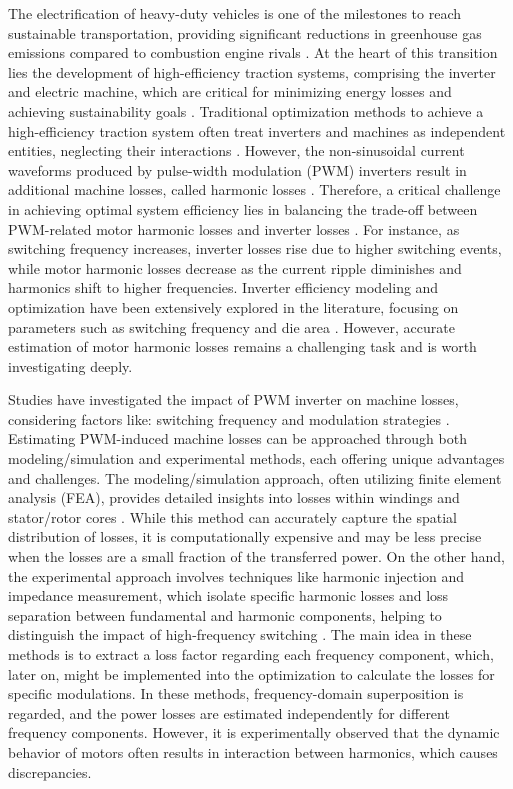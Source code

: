\documentclass[conference]{IPEC2026}
\begin{document}
The electrification of heavy-duty vehicles is one of the milestones to reach sustainable transportation, providing significant reductions in greenhouse gas emissions compared to combustion engine rivals \cite{ElectrificationVehicles}. 
At the heart of this transition lies the development of high-efficiency traction systems, comprising the inverter and electric machine, which are critical for minimizing energy losses and achieving sustainability goals \cite{HeartOfTraction,Outlook_EV}.
Traditional optimization methods to achieve a high-efficiency traction system often treat inverters and machines as independent entities, neglecting their interactions \cite{Traditional_Optimization,Traditional_Optimization_2}. 
However, the non-sinusoidal current waveforms produced by pulse-width modulation (PWM) inverters result in additional machine losses, called harmonic losses \cite{PWMLoss1,PWMLoss3}. 
Therefore, a critical challenge in achieving optimal system efficiency lies in balancing the trade-off between PWM-related motor harmonic losses and inverter losses \cite{PWMLoss2}. 
For instance, as switching frequency increases, inverter losses rise due to higher switching events, while motor harmonic losses decrease as the current ripple diminishes and harmonics shift to higher frequencies. 
Inverter efficiency modeling and optimization have been extensively explored in the literature, focusing on parameters such as switching frequency and die area \cite{DieAreaOptimization}. 
However, accurate estimation of motor harmonic losses remains a challenging task and is worth investigating deeply. 

Studies have investigated the impact of PWM inverter on machine losses, considering factors like: switching frequency and modulation strategies \cite{PWM_motor_studies, PWM_motor_studies2}.
Estimating PWM-induced machine losses can be approached through both modeling/simulation and experimental methods, each offering unique advantages and challenges.
The modeling/simulation approach, often utilizing finite element analysis (FEA), provides detailed insights into losses within windings and stator/rotor cores \cite{Modelling_PWM_loss, Modelling_PWM_loss_2,Modelling_PWM_loss_3}.
While this method can accurately capture the spatial distribution of losses, it is computationally expensive and may be less precise when the losses are a small fraction of the transferred power.
On the other hand, the experimental approach involves techniques like harmonic injection and impedance measurement, which isolate specific harmonic losses and loss separation between fundamental and harmonic components, helping to distinguish the impact of high-frequency switching \cite{Impedance_based,harmonic_injection, Harmonic_injection_2}. 
The main idea in these methods is to extract a loss factor regarding each frequency component, which, later on, might be implemented into the optimization to calculate the losses for specific modulations. In these methods, frequency-domain superposition is regarded, and the power losses are estimated independently for different frequency components.  
However, it is experimentally observed that the dynamic behavior of motors often results in interaction between harmonics, which causes discrepancies. 
\end{document}
